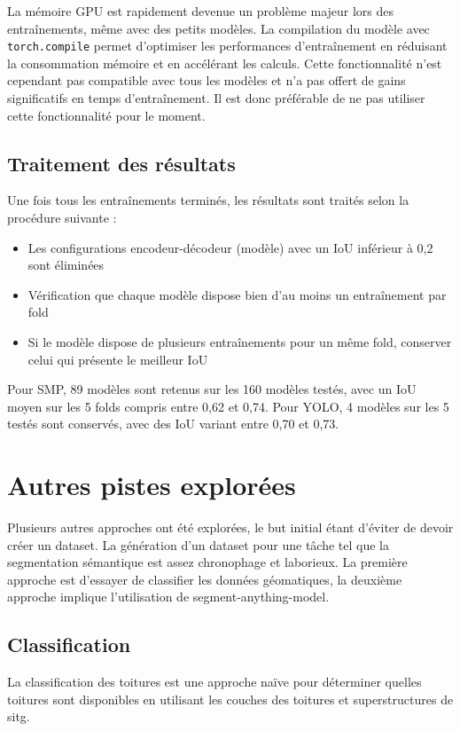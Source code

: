 La mémoire GPU est rapidement devenue un problème majeur lors des entraînements, même avec des petits modèles. La compilation du modèle avec \texttt{torch.compile} permet d'optimiser les performances d'entraînement en réduisant la consommation mémoire et en accélérant les calculs. Cette fonctionnalité n'est cependant pas compatible avec tous les modèles et n'a pas offert de gains significatifs en temps d'entraînement. Il est donc préférable de ne pas utiliser cette fonctionnalité pour le moment.

\subsection{Traitement des résultats}
Une fois tous les entraînements terminés, les résultats sont traités selon la procédure suivante :
\begin{itemize}
    \item Les configurations encodeur-décodeur (modèle) avec un IoU inférieur à 0,2 sont éliminées
    \item Vérification que chaque modèle dispose bien d'au moins un entraînement par fold
    \item Si le modèle dispose de plusieurs entraînements pour un même fold, conserver celui qui présente le meilleur IoU
\end{itemize}

Pour SMP, 89 modèles sont retenus sur les 160 modèles testés, avec un IoU moyen sur les 5 folds compris entre 0,62 et 0,74. Pour YOLO, 4 modèles sur les 5 testés sont conservés, avec des IoU variant entre 0,70 et 0,73.

\newpage
\section{Autres pistes explorées}
\label{sec:pistes_explorees}
Plusieurs autres approches ont été explorées, le but initial étant d'éviter de devoir créer un dataset. La génération d'un dataset pour une tâche tel que la segmentation sémantique est assez chronophage et laborieux. La première approche est d'essayer de classifier les données géomatiques, la deuxième approche implique l'utilisation de segment-anything-model.

\subsection{Classification}
La classification des toitures est une approche naïve pour déterminer quelles toitures sont disponibles en utilisant les couches des toitures et superstructures de \acrshort{sitg}.

